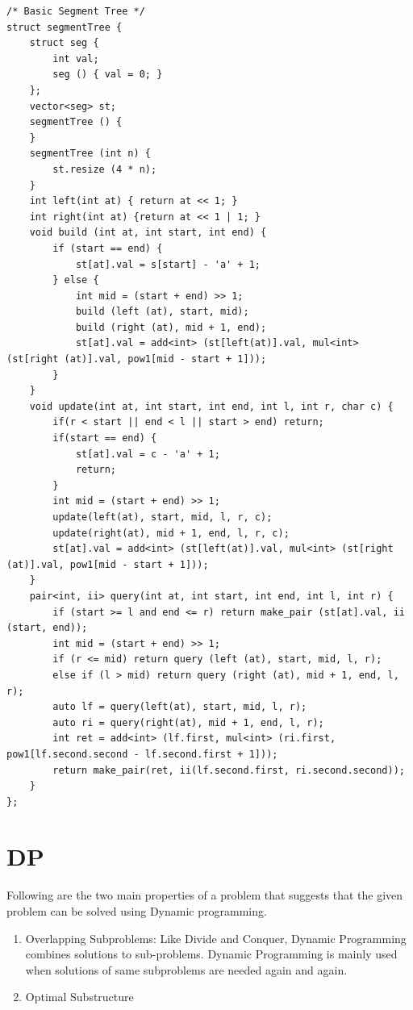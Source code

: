 \documentclass[8pt, a4paper, oneside, twocolumn]{extarticle}
\begin{document}
\begin{verbatim}
/* Basic Segment Tree */
struct segmentTree {
    struct seg {
        int val;
        seg () { val = 0; }
    };
    vector<seg> st;
    segmentTree () {
    }
    segmentTree (int n) {
        st.resize (4 * n);
    }
    int left(int at) { return at << 1; }
    int right(int at) {return at << 1 | 1; }
    void build (int at, int start, int end) {
        if (start == end) {
            st[at].val = s[start] - 'a' + 1;
        } else {
            int mid = (start + end) >> 1;
            build (left (at), start, mid);
            build (right (at), mid + 1, end);
            st[at].val = add<int> (st[left(at)].val, mul<int> (st[right (at)].val, pow1[mid - start + 1]));
        }
    }
    void update(int at, int start, int end, int l, int r, char c) {
        if(r < start || end < l || start > end) return;
        if(start == end) {
            st[at].val = c - 'a' + 1;
            return;
        }
        int mid = (start + end) >> 1;
        update(left(at), start, mid, l, r, c);
        update(right(at), mid + 1, end, l, r, c);
        st[at].val = add<int> (st[left(at)].val, mul<int> (st[right (at)].val, pow1[mid - start + 1]));
    }
    pair<int, ii> query(int at, int start, int end, int l, int r) {
        if (start >= l and end <= r) return make_pair (st[at].val, ii (start, end));
        int mid = (start + end) >> 1;
        if (r <= mid) return query (left (at), start, mid, l, r);
        else if (l > mid) return query (right (at), mid + 1, end, l, r);
        auto lf = query(left(at), start, mid, l, r);
        auto ri = query(right(at), mid + 1, end, l, r);
        int ret = add<int> (lf.first, mul<int> (ri.first, pow1[lf.second.second - lf.second.first + 1]));
        return make_pair(ret, ii(lf.second.first, ri.second.second));
    }
};
\end{verbatim}
\section{DP}
Following are the two main properties of a problem that suggests that the given problem can be solved using Dynamic programming.
\begin{enumerate}
    \item Overlapping Subproblems: Like Divide and Conquer, Dynamic Programming combines solutions to sub-problems. Dynamic Programming is mainly used when solutions of same subproblems are needed again and again.
    \item Optimal Substructure
\end{enumerate}
\end{document}
